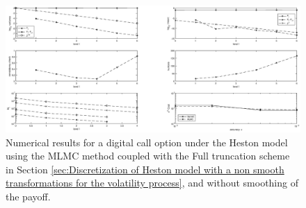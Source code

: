 	\begin{figure}[h!]
\centering
\includegraphics[width=1.2\linewidth]{./figures/MLMC_binary_Heston_opt/without_smoothing/digital_option_set1_L_0_1_steps_L_6}

\caption{Numerical results for a digital call option under the Heston model using the MLMC method coupled with  the Full truncation scheme in Section \ref{sec:Discretization of Heston model with a non smooth transformations for the volatility process}, and without smoothing of the payoff.}
\label{fig:euler_digital_Heston_without_smoothing}
\end{figure}



